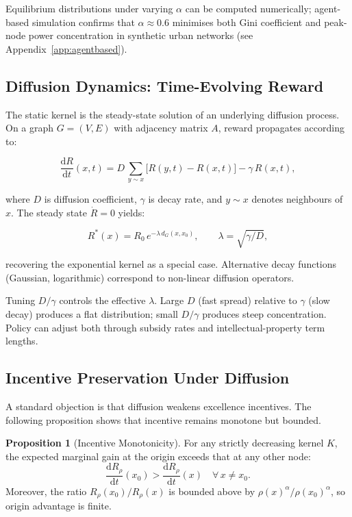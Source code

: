 \documentclass[12pt,a4paper]{article}
\theoremstyle{definition}
\newtheorem{proposition}{Proposition}[section]
\newcommand{\ddt}[1]{\frac{\mathrm{d}#1}{\mathrm{d}t}}
\begin{document}
Equilibrium distributions under varying $\alpha$ can be computed numerically;
agent-based simulation confirms that $\alpha \approx 0.6$ minimises both
Gini coefficient and peak-node power concentration in synthetic urban networks
(see Appendix~\ref{app:agentbased}).

\subsection{Diffusion Dynamics: Time-Evolving Reward}

The static kernel is the steady-state solution of an underlying diffusion
process.  On a graph $G = (V, E)$ with adjacency matrix $A$, reward
propagates according to:

\begin{equation}
  \ddt{R}(x,t) = D\,\sum_{y \sim x} \bigl[R(y,t) - R(x,t)\bigr]
               - \gamma\,R(x,t),
  \label{eq:diffusion}
\end{equation}

where $D$ is diffusion coefficient, $\gamma$ is decay rate, and $y \sim x$
denotes neighbours of $x$.  The steady state $\dot{R} = 0$ yields:

\begin{equation}
  R^*(x) = R_0\,e^{-\lambda\,d_G(x,x_0)}, \qquad
  \lambda = \sqrt{\gamma / D},
\end{equation}

recovering the exponential kernel as a special case.  Alternative decay
functions (Gaussian, logarithmic) correspond to non-linear diffusion operators.

\begin{tcolorbox}[policybox]
  Tuning $D/\gamma$ controls the effective $\lambda$.  Large $D$ (fast spread)
  relative to $\gamma$ (slow decay) produces a flat distribution; small
  $D/\gamma$ produces steep concentration.  Policy can adjust both through
  subsidy rates and intellectual-property term lengths.
\end{tcolorbox}

\subsection{Incentive Preservation Under Diffusion}

A standard objection is that diffusion weakens excellence incentives.  The
following proposition shows that incentive remains monotone but bounded.

\begin{proposition}[Incentive Monotonicity]
  For any strictly decreasing kernel $K$, the expected marginal gain at the
  origin exceeds that at any other node:
  \begin{equation}
    \ddt{R_\rho}(x_0) > \ddt{R_\rho}(x) \quad \forall\, x \neq x_0.
  \end{equation}
  Moreover, the ratio $R_\rho(x_0)/R_\rho(x)$ is bounded above by
  $\rho(x)^\alpha / \rho(x_0)^\alpha$, so origin advantage is finite.
\end{proposition}
\end{document}
